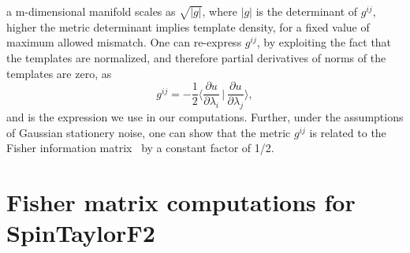 a m-dimensional manifold scales as $\sqrt{|g|}$, where $|g|$ is the
determinant of $g^{ij}$, higher the metric determinant implies template
density, for a fixed value of maximum allowed mismatch. One can re-express
$g^{ij}$, by exploiting the fact that the templates are normalized, and
therefore partial derivatives of norms of the templates are zero, as
\begin{equation}
g^{ij} = -\dfrac{1}{2}\langle \dfrac{\partial
u}{\partial\lambda_i}\,|\,\dfrac{\partial
u}{\partial\lambda_j} \rangle,
\end{equation}
and is the expression we use in our computations. Further, under the assumptions
of Gaussian stationery noise, one can show that the metric $g^{ij}$ is related to 
the Fisher information matrix~\cite{Fisher} by a constant factor of 1/2. 

\section{Fisher matrix computations for SpinTaylorF2}









